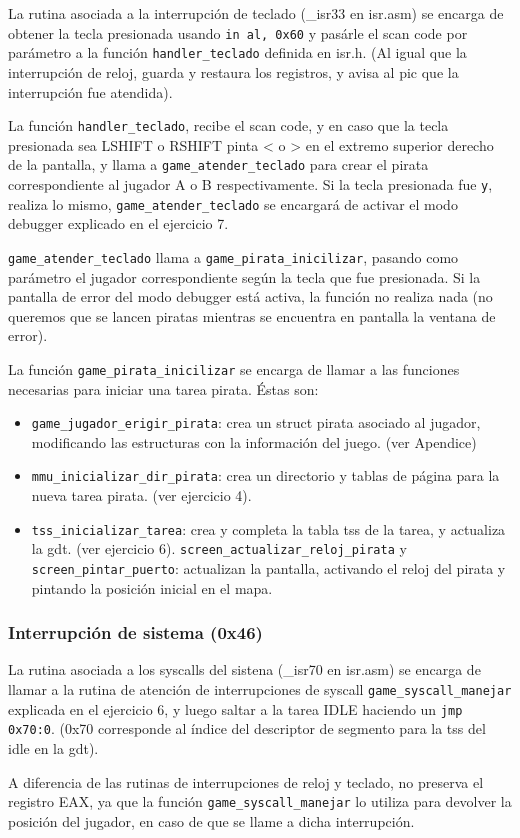 \par La rutina asociada a la interrupción de teclado (_isr33 en isr.asm) se encarga de obtener la tecla presionada usando  \texttt{in al, 0x60} y pasárle el scan code por parámetro a la función \texttt{handler_teclado} definida en isr.h. (Al igual que la interrupción de reloj, guarda y restaura los registros, y avisa al pic que la interrupción fue atendida).
\par La función \texttt{handler_teclado}, recibe el scan code, y en caso que la tecla presionada sea LSHIFT o RSHIFT pinta < o > en el extremo superior derecho de la pantalla, y llama a \texttt{game_atender_teclado} para crear el pirata correspondiente al jugador A o B respectivamente. Si la tecla presionada fue \texttt{y}, realiza lo mismo, \texttt{game_atender_teclado} se encargará de activar el modo debugger explicado en el ejercicio 7.
\par \texttt{game_atender_teclado} llama a  \texttt{game_pirata_inicilizar}, pasando como parámetro el jugador correspondiente según la tecla que fue presionada. Si la pantalla de error del modo debugger está activa, la función no realiza nada (no queremos que se lancen piratas mientras se encuentra en pantalla la ventana de error).
\par La función \texttt{game_pirata_inicilizar} se encarga de llamar a las funciones necesarias para iniciar una tarea pirata. Éstas son:
\begin{itemize}
\item \texttt{game_jugador_erigir_pirata}:    crea un struct pirata asociado al jugador, modificando las estructuras con la información del juego. (ver Apendice)
\item  \texttt{mmu_inicializar_dir_pirata}: crea un directorio y tablas de página para la nueva tarea pirata. (ver ejercicio 4).
\item  \texttt{tss_inicializar_tarea}: crea y completa la tabla tss de la tarea, y actualiza la gdt. (ver ejercicio 6).
\texttt{screen_actualizar_reloj_pirata} y \texttt{screen_pintar_puerto}: actualizan la pantalla, activando el reloj del pirata y pintando la posición inicial en el mapa.
\end{itemize}

	\subsubsection*{Interrupción de sistema (0x46)}
	
\par \par La rutina asociada a los syscalls del sistena (_isr70 en isr.asm) se encarga de llamar a la rutina de atención de interrupciones de syscall \texttt{game_syscall_manejar} explicada en el ejercicio 6, y luego saltar a la tarea IDLE haciendo un \texttt{jmp 0x70:0}. (0x70 corresponde al índice del descriptor de segmento para la tss del idle en la gdt). 
\par A diferencia de las rutinas de interrupciones de reloj y teclado, no preserva el registro EAX, ya que la función \texttt{game_syscall_manejar} lo utiliza para devolver la posición del jugador, en caso de que se llame a dicha interrupción.
	